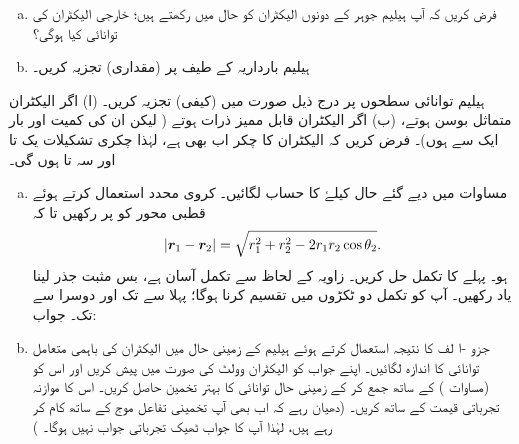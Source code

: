 \begin{enumerate}[a.]
\item
فرض کریں کہ آپ ہیلیم جوہر کے دونوں الیکٹران کو  حال میں رکھتے ہیں؛ خارجی الیکٹران کی توانائی کیا ہوگی؟
\item
ہیلیم بارداریہ  کے طیف پر (مقداری) تجزیہ کریں۔ 
\end{enumerate}
ہیلیم توانائی سطحوں پر درج ذیل صورت میں (کیفی) تجزیہ کریں۔ (ا) اگر الیکٹران متماثل بوسن ہوتے، (ب) اگر الیکٹران قابل ممیز ذرات ہوتے ( لیکن ان کی کمیت اور بار ایک سے ہوں)۔ فرض کریں کہ الیکٹران کا چکر اب بھی  ہے، لہٰذا چکری تشکیلات یک تا اور سہ تا ہوں گی۔
\begin{enumerate}[a.]
\item
مساوات  میں دیے گئے حال  کیلۓ  کا حساب لگائیں۔  کروی محدد استعمال کرتے ہوئے قطبی محور کو  پر رکھیں تا کہ
\begin{align*}
|{{\boldsymbol{r}}}_{1}-{{\boldsymbol{r}}}_{2}|= \sqrt{r_1^2+ r_2^2 -2r_{1} r_{2}\cos\theta_{2}}.
\end{align*}
ہو۔ پہلے  کا تکمل حل کریں۔ زاویہ  کے لحاظ سے تکمل آسان ہے، بس مثبت جذر لینا یاد رکھیں۔ آپ کو  تکمل دو ٹکڑوں میں تقسیم کرنا ہوگا؛ پہلا سے  تک اور دوسرا  سے  تک۔ جواب:  
\item
جزو -ا لف کا نتیجہ استعمال کرتے ہوئے ہیلیم کے زمینی حال میں الیکٹران کی باہمی متعامل توانائی کا اندازہ لگائیں۔ اپنے جواب کو الیکٹران وولٹ کی صورت میں پیش کریں اور اس کو  (مساوات ) کے ساتھ جمع کر کے زمینی حال توانائی کا بہتر تخمین حاصل کریں۔ اس کا موازنہ تجرباتی قیمت کے ساتھ کریں۔ (دھیان رہے کہ اب بھی آپ تخمینی تفاعل موج کے ساتھ کام کر رہے ہیں، لہٰذا آپ کا جواب ٹھیک تجرباتی جواب نہیں ہوگا۔ )
\end{enumerate}


